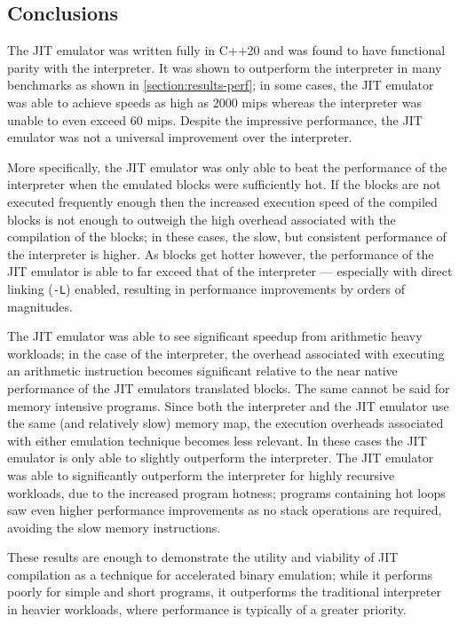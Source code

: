 \subsection{Conclusions}

The JIT emulator was written fully in C++20 and was found to have functional parity with the interpreter. It was shown to outperform the interpreter in many benchmarks as shown in \autoref{section:results-perf}; in some cases, the JIT emulator was able to achieve speeds as high as 2000 mips whereas the interpreter was unable to even exceed 60 mips. Despite the impressive performance, the JIT emulator was not a universal improvement over the interpreter.

More specifically, the JIT emulator was only able to beat the performance of the interpreter when the emulated blocks were sufficiently hot. If the blocks are not executed frequently enough then the increased execution speed of the compiled blocks is not enough to outweigh the high overhead associated with the compilation of the blocks; in these cases, the slow, but consistent performance of the interpreter is higher. As blocks get hotter however, the performance of the JIT emulator is able to far exceed that of the interpreter — especially with direct linking (\texttt{-L}) enabled, resulting in performance improvements by orders of magnitudes.

The JIT emulator was able to see significant speedup from arithmetic heavy workloads; in the case of the interpreter, the overhead associated with executing an arithmetic instruction becomes significant relative to the near native performance of the JIT emulators translated blocks. The same cannot be said for memory intensive programs. Since both the interpreter and the JIT emulator use the same (and relatively slow) memory map, the execution overheads associated with either emulation technique becomes less relevant. In these cases the JIT emulator is only able to slightly outperform the interpreter. The JIT emulator was able to significantly outperform the interpreter for highly recursive workloads, due to the increased program hotness; programs containing hot loops saw even higher performance improvements as no stack operations are required, avoiding the slow memory instructions.

These results are enough to demonstrate the utility and viability of JIT compilation as a technique for accelerated binary emulation; while it performs poorly for simple and short programs, it outperforms the traditional interpreter in heavier workloads, where performance is typically of a greater priority.

